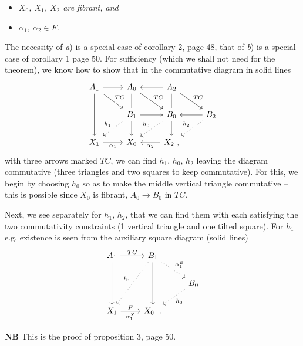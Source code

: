 \begin{itemize}[leftmargin=3em]
\item[a)] \textit{$X_0$, $X_1$, $X_2$ are fibrant, and}
\item[b)] \textit{$\alpha_1$, $\alpha_2 \in F$.}
\end{itemize}

The necessity of \textit{a}) is a special case of corollary 2, page 48, that of \textit{b}) is a special case of corollary 1 page 50. For sufficiency (which we shall not need for the theorem), we know how to show that in the commutative diagram in solid lines
\[
\begin{tikzcd}
A_1 \arrow[r] \arrow[dr, "TC"] \arrow[dd] & A_0 \arrow[dr, "TC"] \arrow[d, dash] & A_2 \arrow[l] \arrow[dr, "TC"] \arrow[d, dash] & \\
 & B_1 \arrow[r] \arrow[dl, dotted, "h_1"'] \arrow[d] & B_0 \arrow[dl, dotted, "h_0"'] \arrow[d] & B_2 \arrow[l] \arrow[dl, dotted, "h_2"'] \\
X_1 \arrow[r, "\alpha_1"'] & X_0 & X_2 \ , \arrow[l, "\alpha_2"] &
\end{tikzcd}
\]
with three arrows marked $TC$, we can find $h_1$, $h_0$, $h_2$ leaving the diagram commutative (three triangles and two squares to keep commutative). For this, we begin by choosing $h_0$ so as to make the middle vertical triangle commutative -- this is possible since $X_0$ is fibrant, $A_0 \longrightarrow B_0$ in $TC$.


Next, we see separately for $h_1$, $h_2$, that we can find them with each satisfying the two commutativity constraints (1 vertical triangle and one tilted square). For $h_1$ e.g. existence is seen from the auxiliary square diagram (solid lines)
\[
\begin{tikzcd}
A_1 \arrow[r, "TC"] \arrow[dd] & B_1 \arrow[dd] \arrow[ddl, dotted, "h_1"'] \arrow[dr, dotted, "\alpha_1^B"] & \\
 & & B_0 \arrow[dl, dotted, "h_0"] \\
X_1 \arrow[r, "F", "\alpha_1^X"'] & X_0 \ \ . &
\end{tikzcd}
\]

\textbf{NB} This is the proof of proposition 3, page 50.


